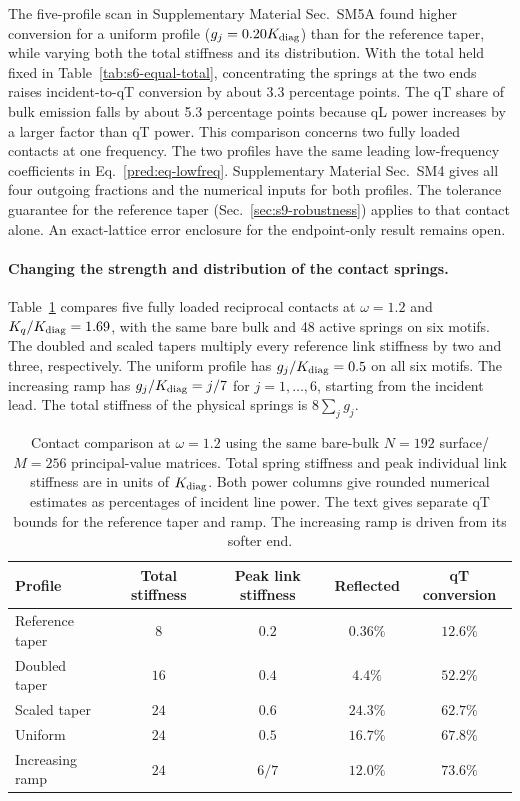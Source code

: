 \documentclass[10pt,aps,onecolumn,floatfix,notitlepage,nofootinbib,showkeys]{revtex4-2}
\begin{document}
The five-profile scan in Supplementary Material Sec.~SM5A found higher conversion for a uniform profile ($g_j=0.20K_{\rm diag}$) than for the reference taper, while varying both the total stiffness and its distribution. With the total held fixed in Table~\ref{tab:s6-equal-total}, concentrating the springs at the two ends raises incident-to-qT conversion by about 3.3 percentage points. The qT share of bulk emission falls by about 5.3 percentage points because qL power increases by a larger factor than qT power. This comparison concerns two fully loaded contacts at one frequency. The two profiles have the same leading low-frequency coefficients in Eq.~\eqref{pred:eq-lowfreq}. Supplementary Material Sec.~SM4 gives all four outgoing fractions and the numerical inputs for both profiles. The tolerance guarantee for the reference taper (Sec.~\ref{sec:s9-robustness}) applies to that contact alone. An exact-lattice error enclosure for the endpoint-only result remains open.

\paragraph*{Changing the strength and distribution of the contact springs.}
Table~\ref{tab:s6-coupling-comparison} compares five fully loaded reciprocal contacts at $\omega=1.2$ and $K_q/K_{\rm diag}=1.69$, with the same bare bulk and 48 active springs on six motifs. The doubled and scaled tapers multiply every reference link stiffness by two and three, respectively. The uniform profile has $g_j/K_{\rm diag}=0.5$ on all six motifs. The increasing ramp has $g_j/K_{\rm diag}=j/7$ for $j=1,\ldots,6$, starting from the incident lead. The total stiffness of the physical springs is $8\sum_jg_j$.

\begin{table}[!htbp]
 \centering
 \caption{Contact comparison at $\omega=1.2$ using the same bare-bulk $N=192$ surface/$M=256$ principal-value matrices. Total spring stiffness and peak individual link stiffness are in units of $K_{\rm diag}$. Both power columns give rounded numerical estimates as percentages of incident line power. The text gives separate qT bounds for the reference taper and ramp. The increasing ramp is driven from its softer end.}
 \label{tab:s6-coupling-comparison}
 \begin{ruledtabular}
 \begin{tabular}{lcccc}
 Profile & Total stiffness & Peak link stiffness & Reflected & qT conversion\\
 \hline
 Reference taper & $8$ & $0.2$ & $0.36\%$ & $12.6\%$\\
 Doubled taper & $16$ & $0.4$ & $4.4\%$ & $52.2\%$\\
 Scaled taper & $24$ & $0.6$ & $24.3\%$ & $62.7\%$\\
 Uniform & $24$ & $0.5$ & $16.7\%$ & $67.8\%$\\
 Increasing ramp & $24$ & $6/7$ & $12.0\%$ & $73.6\%$\\
 \end{tabular}
 \end{ruledtabular}
\end{table}
\end{document}
